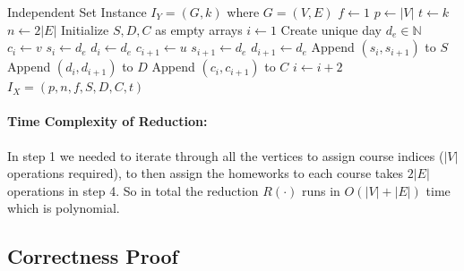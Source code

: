 \documentclass[11pt]{article}
\begin{document}
\begin{algorithm}
\caption{Reduction Algorithm $R(I_Y)$}
\begin{algorithmic}[1]
\Require Independent Set Instance $I_Y = (G, k)$ where $G = (V,E)$
\State $f \gets 1$ %
\State $p \gets |V|$ %
\State $t \gets k$ %
\State $n \gets 2|E|$ %
\State Initialize $S, D, C$ as empty arrays
\State $i \gets 1$
    \State Create unique day $d_e \in \mathbb{N}$
    \State $c_i \gets v$
    \State $s_i \gets d_e$
    \State $d_i \gets d_e$
    \State $c_{i+1} \gets u$
    \State $s_{i+1} \gets d_e$
    \State $d_{i+1} \gets d_e$
    \State Append $(s_i, s_{i+1})$ to $S$
    \State Append $(d_i, d_{i+1})$ to $D$
    \State Append $(c_i, c_{i+1})$ to $C$
    \State $i \gets i + 2$
\EndFor
\State \Return $I_X = (p, n, f, S, D, C, t)$
\end{algorithmic}
\end{algorithm}

\paragraph{Time Complexity of Reduction:}
In step 1 we needed to iterate through all the vertices to assign course indices ($|V|$ operations required), to then assign the homeworks to each course takes $2|E|$ operations in step 4.
So in total the reduction $R(\cdot)$ runs in $O(|V| + |E|)$ time which is polynomial.

\subsection{Correctness Proof}
\end{document}
